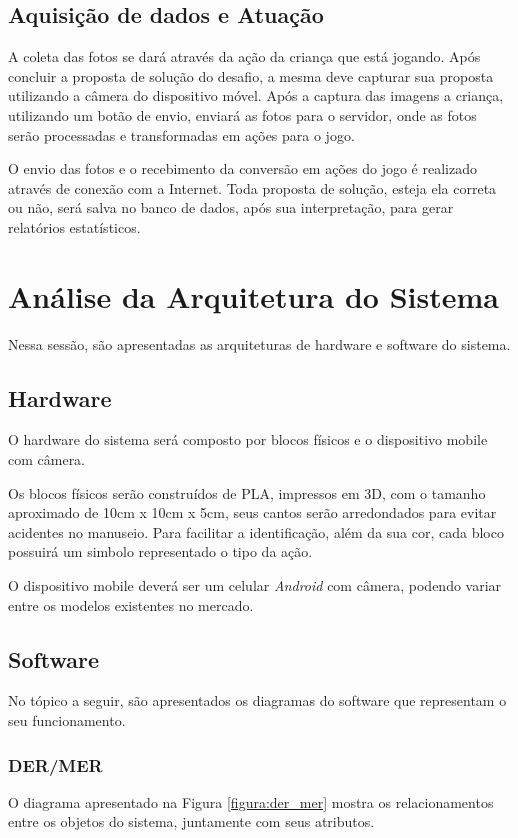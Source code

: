     \subsection{Aquisição de dados e Atuação}
    A coleta das fotos se dará através da ação da criança que está jogando. Após concluir a proposta de solução do desafio, a mesma deve capturar sua proposta utilizando a câmera do dispositivo móvel.
    Após a captura das imagens a criança, utilizando um botão de envio, enviará as fotos para o servidor, onde as fotos serão processadas e transformadas em ações para o jogo.
    
    O envio das fotos e o recebimento da conversão em ações do jogo é realizado através de conexão com a Internet.
    Toda proposta de solução, esteja ela correta ou não, será salva no banco de dados, após sua interpretação, para gerar relatórios estatísticos.


\section{Análise da Arquitetura do Sistema}
    Nessa sessão, são apresentadas as arquiteturas de hardware e software do sistema.

    \subsection{Hardware}
    O hardware do sistema será composto por blocos físicos e o dispositivo mobile com câmera.
    
    Os blocos físicos serão construídos de PLA, impressos em 3D, com o tamanho aproximado de 10cm x 10cm x 5cm, seus cantos serão arredondados para evitar acidentes no manuseio. Para facilitar a identificação, além da sua cor, cada bloco possuirá um simbolo representado o tipo da ação.
    
    O dispositivo mobile deverá ser um celular \textit{Android} com câmera, podendo variar entre os modelos existentes no mercado.
    
    \subsection{Software}
     No tópico a seguir, são apresentados os diagramas do software que representam o seu funcionamento.
        
        \subsubsection{DER/MER}
        O diagrama apresentado na Figura \ref{figura:der_mer} mostra os relacionamentos entre os objetos do sistema, juntamente com seus atributos.
        
